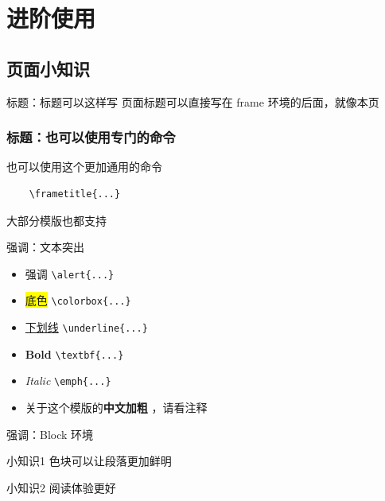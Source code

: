 \documentclass[AutoFakeBold,AutoFakeSlant]{beamer}
\begin{document}
\section{进阶使用}
\subsection{页面小知识}

\begin{frame}[fragile]{标题：标题可以这样写}
    页面标题可以直接写在 frame 环境的后面，就像本页
\end{frame}

\begin{frame}[fragile]
\frametitle{标题：也可以使用专门的命令}
    也可以使用这个更加通用的命令\\
    \vspace{1em}
\begin{verbatim}
    \frametitle{...}
\end{verbatim}
    \vspace{1em}
    大部分模版也都支持\\
\end{frame}

\begin{frame}[fragile]{强调：文本突出}
\begin{itemize}
    \item \alert{强调} \verb|\alert{...}|
    \item \colorbox{yellow}{底色} \verb|\colorbox{...}|
    \item \underline{下划线} \verb|\underline{...}|
    \item \textbf{Bold} \verb|\textbf{...}|
    \item \emph{Italic} \verb|\emph{...}|
    \item 关于这个模版的\textbf{中文加粗} ，请看注释
\end{itemize}


\end{frame}

\begin{frame}{强调：Block 环境}
\begin{block}{小知识1}
    色块可以让段落更加鲜明
\end{block}
\vspace{1em}
\begin{block}{小知识2}
    阅读体验更好
\end{block}
\end{frame}
\end{document}
